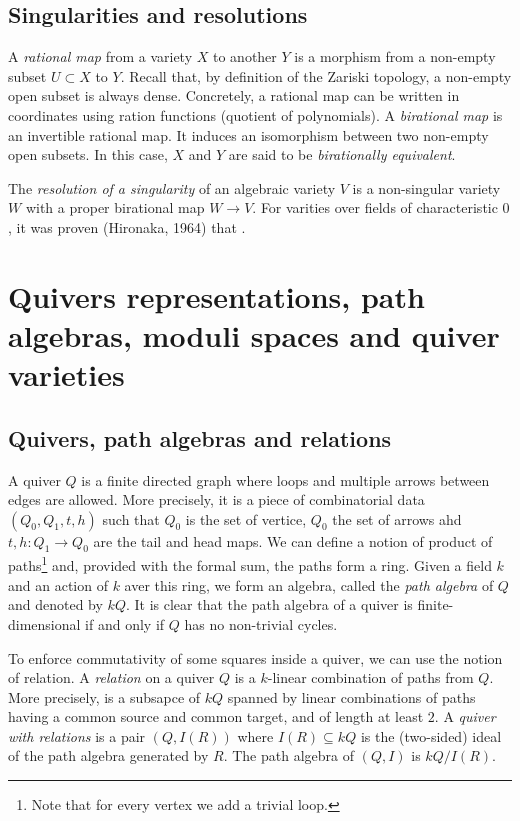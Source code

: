     \subsection{Singularities and resolutions}

        A \emph{rational map} from a variety $X$ to another $Y$ is a morphism from a non-empty subset $U\subset X$ to $Y$. Recall that, by definition of the Zariski topology, a non-empty open subset is always dense. Concretely, a rational map can be written in coordinates using ration functions (quotient of polynomials). A \emph{birational map} is an invertible rational map. It induces an isomorphism between two non-empty open subsets. In this case, $X$ and $Y$ are said to be \emph{birationally equivalent}.

        The \emph{resolution of a singularity} of an algebraic variety $V$ is a non-singular variety $W$ with a proper birational map $W\to V$. For varities over fields of characteristic $0$, it was proven (Hironaka, 1964) that \marker.

\section{Quivers representations, path algebras, moduli spaces and quiver varieties}

    \subsection{Quivers, path algebras and relations}

        A quiver $Q$ is a finite directed graph where loops and multiple arrows between edges are allowed. More precisely, it is a piece of combinatorial data $(Q_0,Q_1,t,h)$ such that $Q_0$ is the set of vertice, $Q_0$ the set of arrows ahd $t,h:Q_1\to Q_0$ are the tail and head maps. We can define a notion of product of paths\footnote{Note that for every vertex we add a trivial loop.} and, provided with the formal sum, the paths form a ring. Given a field $k$ and an action of $k$ aver this ring, we form an algebra, called the \emph{path algebra} of $Q$ and denoted by $kQ$. It is clear that the path algebra of a quiver is finite-dimensional if and only if $Q$ has no non-trivial cycles.

        To enforce commutativity of some squares inside a quiver, we can use the notion of relation. A \emph{relation} on a quiver $Q$ is a $k$-linear combination of paths from $Q$. More precisely, is a subsapce of $kQ$ spanned by linear combinations of paths having a common source and common target, and of length at least $2$. A \emph{quiver with relations} is a pair $(Q,I(R))$ where $I(R)\subseteq kQ$ is the (two-sided) ideal of the path algebra generated by $R$. The path algebra of $(Q,I)$ is $kQ/I(R)$. 
        
